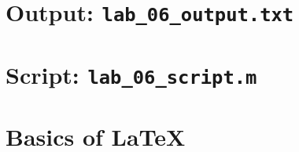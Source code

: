 \section{Output: \lstinline[style=Plain]{lab_06_output.txt}}

\newpage
\section{Script: \lstinline[style=Plain]{lab_06_script.m}}

\newpage
\section{Basics of \LaTeX{}}

